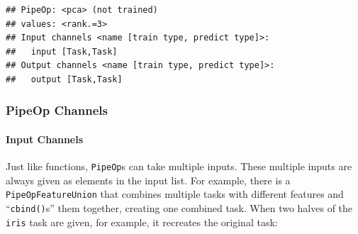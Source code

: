 \documentclass[]{article}
\newenvironment{Shaded}{\begin{snugshade}}{\end{snugshade}}
\newcommand{\DataTypeTok}[1]{\textcolor[rgb]{0.13,0.29,0.53}{#1}}
\newcommand{\DecValTok}[1]{\textcolor[rgb]{0.00,0.00,0.81}{#1}}
\newcommand{\KeywordTok}[1]{\textcolor[rgb]{0.13,0.29,0.53}{\textbf{#1}}}
\newcommand{\NormalTok}[1]{#1}
\newcommand{\OperatorTok}[1]{\textcolor[rgb]{0.81,0.36,0.00}{\textbf{#1}}}
\newcommand{\StringTok}[1]{\textcolor[rgb]{0.31,0.60,0.02}{#1}}
\let\oldparagraph\paragraph
\renewcommand{\paragraph}[1]{\oldparagraph{#1}\mbox{}}
\renewenvironment{Shaded} {\begin{snugshade}\small} {\end{snugshade}}
\begin{document}
\begin{verbatim}
## PipeOp: <pca> (not trained)
## values: <rank.=3>
## Input channels <name [train type, predict type]>:
##   input [Task,Task]
## Output channels <name [train type, predict type]>:
##   output [Task,Task]
\end{verbatim}

\hypertarget{pipeop-channels}{%
\subsubsection{PipeOp Channels}\label{pipeop-channels}}

\hypertarget{input-channels}{%
\paragraph{Input Channels}\label{input-channels}}

Just like functions, \texttt{PipeOp}s can take multiple inputs.
These multiple inputs are always given as elements in the input list.
For example, there is a \texttt{PipeOpFeatureUnion} that combines multiple tasks with different features and ``\texttt{cbind()}s'' them together, creating one combined task.
When two halves of the \texttt{iris} task are given, for example, it recreates the original task:

\begin{Shaded}
\end{Shaded}
\end{document}

